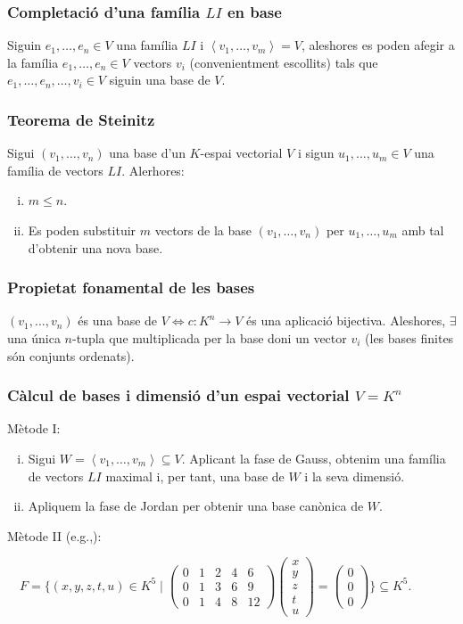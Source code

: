 \subsubsection*{Completació d'una família $LI$ en base}
Siguin $e_{1}, \dots , e_{n} \in V$ una família $LI$ i $\left< v_{1}, \dots , v_{m} \right> = V$, aleshores es poden afegir a la família $e_{1}, \dots , e_{n} \in V$ vectors $v_{i}$ (convenientment escollits) tals que $e_{1}, \dots , e_{n}, \dots , v_{i} \in V$ siguin una base de $V$. 

\subsubsection*{Teorema de Steinitz}
Sigui $(v_1, \dots , v_n)$ una base d'un $K$-espai vectorial $V$ i sigun $u_1, \dots , u_m \in V$ una família de vectors $LI$. Alerhores:
\begin{enumerate}[i)]
    \item $m \leq n$.
    \item Es poden substituir $m$ vectors de la base $(v_1, \dots , v_n)$ per $u_1, \dots , u_m$ amb tal d'obtenir una nova base.
\end{enumerate}

\subsubsection*{Propietat fonamental de les bases}
$(v_{1}, \dots , v_{n})$ és una base de $V \Leftrightarrow c: K^{n} \to V$ és una aplicació bijectiva. Aleshores, $\exists$ una única $n$-tupla que multiplicada per la base doni un vector $v_{i}$ (les bases finites són conjunts ordenats).

\subsubsection*{Càlcul de bases i dimensió d'un espai vectorial $V = K^{n}$}
Mètode I:
\begin{enumerate}[i)]
    \item Sigui $W = \left< v_{1}, \dots , v_{m} \right> \subseteq V$. Aplicant la fase de Gauss, obtenim una família de vectors $LI$ maximal i, per tant, una base de $W$ i la seva dimensió.
    \item Apliquem la fase de Jordan per obtenir una base canònica de $W$.
\end{enumerate}
Mètode II (e.g.,):

$\quad F = \{ (x,y,z,t,u) \in K^{5} \mid \begin{pmatrix} 0 & 1 & 2 & 4 & 6 \\ 0 & 1 & 3 & 6 & 9 \\ 0 & 1 & 4 & 8 & 12 \end{pmatrix} \begin{pmatrix} x \\ y \\ z \\ t\\ u \end{pmatrix} = \begin{pmatrix} 0 \\ 0 \\ 0 \end{pmatrix} \} \subseteq K^{5}$.


